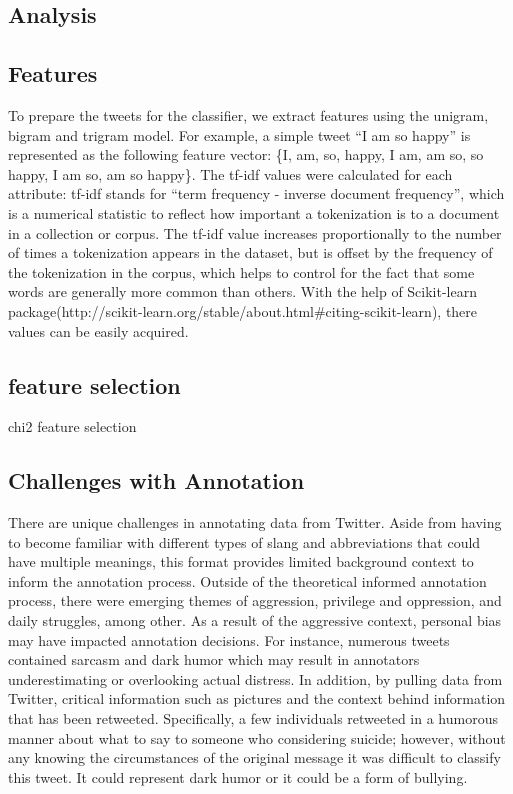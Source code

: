 \documentclass[11pt]{article}
\begin{document}
\subsection{Analysis}



\subsection{Features}

To prepare the tweets for the classifier, we extract features using the unigram, bigram and trigram model. For example, a simple tweet ``I am so happy'' is represented as the following feature vector: \{I, am, so, happy, I am, am so, so happy, I am so, am so happy\}. The tf-idf values were calculated for each attribute: tf-idf stands for ``term frequency - inverse document frequency'', which is a numerical statistic to reflect how important a tokenization is to a document in a collection or corpus. The tf-idf value increases proportionally to the number of times a tokenization appears in the dataset, but is offset by the frequency of the tokenization in the corpus, which helps to control for the fact that some words are generally more common than others. With the help of Scikit-learn package(http://scikit-learn.org/stable/about.html\#citing-scikit-learn), there values can be easily acquired. 

\subsection{feature selection}
chi2 feature selection

\subsection{Challenges with Annotation}

There are unique challenges in annotating data from Twitter.  Aside from having to become familiar with different types of slang and abbreviations that could have multiple meanings, this format provides limited background context to inform the annotation process.  Outside of the theoretical informed annotation process, there were emerging themes of aggression, privilege and oppression, and daily struggles, among other.  As a result of the aggressive context, personal bias may have impacted annotation decisions. For instance, numerous tweets contained sarcasm and dark humor which may result in annotators underestimating or overlooking actual distress. In addition, by pulling data from Twitter, critical information such as pictures and the context behind information that has been retweeted.  Specifically, a few individuals retweeted in a humorous manner about what to say to someone who considering suicide; however, without any knowing the circumstances of the original message it was difficult to classify this tweet.  It could represent dark humor or it could be a form of bullying.
\end{document}
